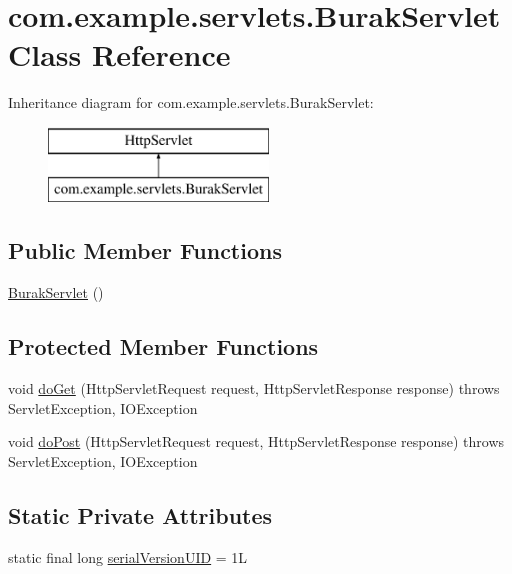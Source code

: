\hypertarget{classcom_1_1example_1_1servlets_1_1_burak_servlet}{}\section{com.\+example.\+servlets.\+Burak\+Servlet Class Reference}
\label{classcom_1_1example_1_1servlets_1_1_burak_servlet}
Inheritance diagram for com.\+example.\+servlets.\+Burak\+Servlet\+:\begin{figure}[H]
\begin{center}
\leavevmode
\includegraphics[height=2.000000cm]{classcom_1_1example_1_1servlets_1_1_burak_servlet}
\end{center}
\end{figure}
\subsection*{Public Member Functions}
\begin{DoxyCompactItemize}
\item 
\hyperlink{classcom_1_1example_1_1servlets_1_1_burak_servlet_a933d316f89b292a7b8d4b84fdd551d45}{Burak\+Servlet} ()
\end{DoxyCompactItemize}
\subsection*{Protected Member Functions}
\begin{DoxyCompactItemize}
\item 
void \hyperlink{classcom_1_1example_1_1servlets_1_1_burak_servlet_afad2ce1980f63c828bcb6bb420276477}{do\+Get} (Http\+Servlet\+Request request, Http\+Servlet\+Response response)  throws Servlet\+Exception, I\+O\+Exception 
\item 
void \hyperlink{classcom_1_1example_1_1servlets_1_1_burak_servlet_ae2d3d9cb85c12eef39cd2145baaf75ef}{do\+Post} (Http\+Servlet\+Request request, Http\+Servlet\+Response response)  throws Servlet\+Exception, I\+O\+Exception 
\end{DoxyCompactItemize}
\subsection*{Static Private Attributes}
\begin{DoxyCompactItemize}
\item 
static final long \hyperlink{classcom_1_1example_1_1servlets_1_1_burak_servlet_a03b3133becc008e75537df6820aaef5c}{serial\+Version\+U\+ID} = 1L
\end{DoxyCompactItemize}


